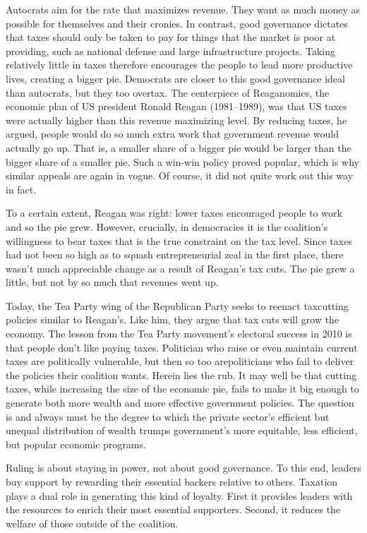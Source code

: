 \documentclass[10pt]{article}
\begin{document}
{\large Autocrats aim for the rate that maximizes revenue. They want as much
money as possible for themselves and their cronies. In contrast, good governance
dictates that taxes should only be taken to pay for things that the market is
poor at providing, such as national defense and large infrastructure projects.
Taking relatively little in taxes therefore encourages the people to lead more
productive lives, creating a bigger pie. Democrats are closer to this good
governance ideal than autocrats, but they too overtax. The centerpiece of
Reaganomics, the economic plan of US president Ronald Reagan (1981--1989), was
that US taxes were actually higher than this revenue maximizing level. By
reducing taxes, he argued, people would do so much extra work that government
revenue would actually go up. That is, a smaller share of a bigger pie would be
larger than the bigger share of a smaller pie. Such a win-win policy proved
popular, which is why similar appeals are again in vogue. Of course, it did not
quite work out this way in fact.}

{\large To a certain extent, Reagan was right: lower taxes encouraged people to
work and so the pie grew. However, crucially, in democracies it is the
coalition's willingness to bear taxes that is the true constraint on the tax
level. Since taxes had not been so high as to squash entrepreneurial zeal in the
first place, there wasn't much appreciable change as a result of Reagan's tax
cuts. The pie grew a little, but not by so much that revenues went up.}

{\large Today, the Tea Party wing of the Republican Party seeks to reenact
taxcutting policies similar to Reagan's. Like him, they argue that tax cuts will
grow the economy. The lesson from the Tea Party movement's electoral success in
2010 is that people don't like paying taxes. Politician who raise or even
maintain current taxes are politically vulnerable, but then so too arepoliticians
who fail to deliver the policies their coalition wants. Herein lies the rub. It
may well be that cutting taxes, while increasing the size of the economic pie,
fails to make it big enough to generate both more wealth and more effective
government policies. The question is and always must be the degree to which the
private sector's efficient but unequal distribution of wealth trumps government's
more equitable, less efficient, but popular economic programs.}

{\large Ruling is about staying in power, not about good governance. To this
end, leaders buy support by rewarding their essential backers relative to others.
Taxation plays a dual role in generating this kind of loyalty. First it provides
leaders with the resources to enrich their most essential supporters. Second, it
reduces the welfare of those outside of the coalition.}
\end{document}

